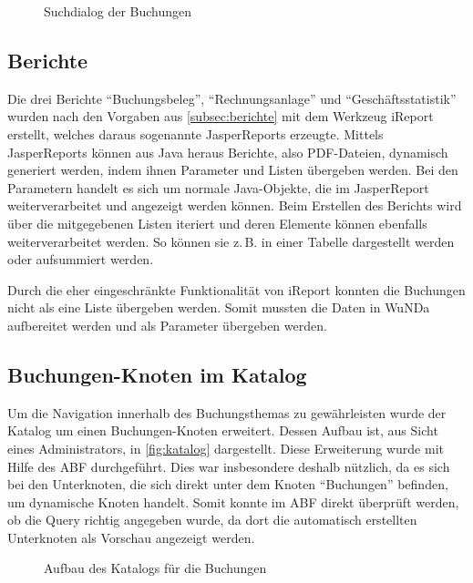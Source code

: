 \begin{figure}[htbp]
	\centering
	\caption{Suchdialog der Buchungen}
	\label{fig:gui-suchdialog}
\end{figure}

\subsection{Berichte}
Die drei Berichte \enquote{Buchungsbeleg}, \enquote{Rechnungsanlage} und \enquote{Geschäftsstatistik} wurden nach den Vorgaben aus \autoref{subsec:berichte} mit dem Werkzeug iReport erstellt, welches daraus sogenannte JasperReports erzeugte.
Mittels JasperReports können aus Java heraus Berichte, also PDF-Dateien, dynamisch generiert werden, indem ihnen Parameter und Listen übergeben werden.
Bei den Parametern handelt es sich um normale Java-Objekte, die im JasperReport weiterverarbeitet und angezeigt werden können.
Beim Erstellen des Berichts wird über die mitgegebenen Listen iteriert und deren Elemente können ebenfalls weiterverarbeitet werden.
So können sie z.\,B. in einer Tabelle dargestellt werden oder aufsummiert werden.

Durch die eher eingeschränkte Funktionalität von iReport konnten die Buchungen nicht als eine Liste übergeben werden.
Somit mussten die Daten in \ac{WuNDa} aufbereitet werden und als Parameter übergeben werden.

\subsection{Buchungen-Knoten im Katalog}
Um die Navigation innerhalb des Buchungsthemas zu gewährleisten wurde der Katalog um einen Buchungen-Knoten erweitert.
Dessen Aufbau ist, aus Sicht eines Administrators, in \autoref{fig:katalog} dargestellt.
Diese Erweiterung wurde mit Hilfe des \ac{ABF} durchgeführt.
Dies war insbesondere deshalb nützlich, da es sich bei den Unterknoten, die sich direkt unter dem Knoten \enquote{Buchungen} befinden, um dynamische Knoten handelt.
Somit konnte im \ac{ABF} direkt überprüft werden, ob die Query richtig angegeben wurde, da dort die automatisch erstellten Unterknoten als Vorschau angezeigt werden.
\begin{figure}[htb]
	\centering
	\caption{Aufbau des Katalogs für die Buchungen}
	\label{fig:katalog}
\end{figure}


